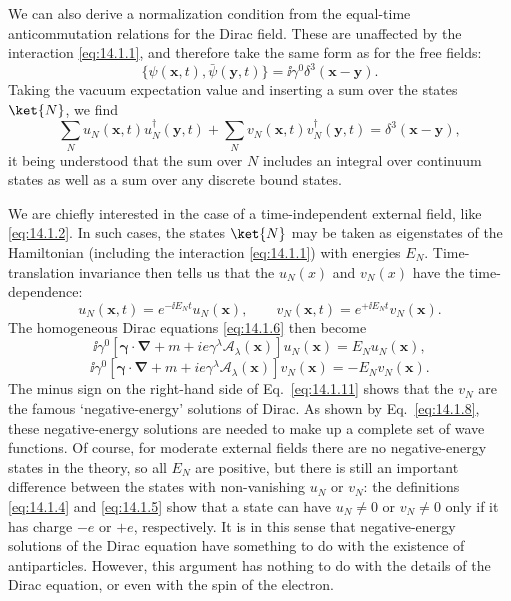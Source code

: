 We can also derive a normalization condition from the equal-time
anticommutation relations for the Dirac field. These are unaffected by the
interaction \eqref{eq:14.1.1}, and therefore take the same form as for the free
fields:
\begin{equation}
  \{\psi(\mathbf x,t),\bar\psi(\mathbf y,t)\}
  =\ii\gamma^0\delta^3(\mathbf x-\mathbf y).
  \tag{14.1.7}\label{eq:14.1.7}
\end{equation}
Taking the vacuum expectation value and inserting a sum over the states
$\ket{N}$, we find
\begin{equation}
  \sum_Nu_N(\mathbf x,t)u_N^\dagger(\mathbf y,t)
  +\sum_Nv_N(\mathbf x,t)v_N^\dagger(\mathbf y,t)
  =\delta^3(\mathbf x-\mathbf y),
  \tag{14.1.8}\label{eq:14.1.8}
\end{equation}
it being understood that the sum over $N$ includes an integral over continuum
states as well as a sum over any discrete bound states.

We are chiefly interested in the case of a time-independent external field,
like \eqref{eq:14.1.2}. In such cases, the states $\ket{N}$ may be taken as
eigenstates of the Hamiltonian (including the interaction \eqref{eq:14.1.1})
with energies $E_N$. Time-translation invariance then tells us that the
$u_N(x)$ and $v_N(x)$ have the time-dependence:
\begin{equation}
  u_N(\mathbf x,t)=e^{-\ii E_Nt}u_N(\mathbf x),\qquad
  v_N(\mathbf x,t)=e^{+\ii E_Nt}v_N(\mathbf x).
  \tag{14.1.9}\label{eq:14.1.9}
\end{equation}
The homogeneous Dirac equations \eqref{eq:14.1.6} then become
\begin{equation}
  \ii\gamma^0\left[\boldsymbol\gamma\cdot\boldsymbol\nabla+m
  +ie\gamma^\lambda\mathcal A_\lambda(\mathbf x)\right]u_N(\mathbf x)
  =E_Nu_N(\mathbf x),
  \tag{14.1.10}\label{eq:14.1.10}
\end{equation}
\begin{equation}
  \ii\gamma^0\left[\boldsymbol\gamma\cdot\boldsymbol\nabla+m
  +ie\gamma^\lambda\mathcal A_\lambda(\mathbf x)\right]v_N(\mathbf x)
  =-E_Nv_N(\mathbf x).
  \tag{14.1.11}\label{eq:14.1.11}
\end{equation}
The minus sign on the right-hand side of Eq.~\eqref{eq:14.1.11} shows that the
$v_N$ are the famous `negative-energy' solutions of Dirac. As shown by
Eq.~\eqref{eq:14.1.8}, these negative-energy solutions are needed to make up a
complete set of wave functions. Of course, for moderate external fields there
are no negative-energy states in the theory, so all $E_N$ are positive, but
there is still an important difference between the states with non-vanishing
$u_N$ or $v_N$: the definitions \eqref{eq:14.1.4} and \eqref{eq:14.1.5} show
that a state can have $u_N\ne0$ or $v_N\ne0$ only if it has charge $-e$ or
$+e$, respectively. It is in this sense that negative-energy solutions of the
Dirac equation have something to do with the existence of antiparticles.
However, this argument has nothing to do with the details of the Dirac
equation, or even with the spin of the electron.

